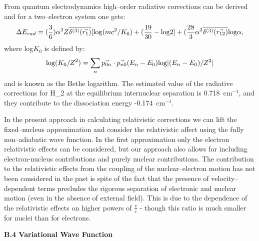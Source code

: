 From quantum electrodynamics high--order radiative corrections can 
be derived and for a two--electron system one gets:\cite{k15}
\begin{equation}
\Delta E_{rad} = (\frac{3}{6})
\alpha^3 Z \overline{\delta^{(3)} (\vec{r_1})}
[{\rm log}(mc^2/K_0) + (\frac{19}{30} - {\rm log}2]
+ (\frac{28}{3} \alpha^3 \overline{\delta^{(3)}(\vec{r_{12}})}
{\rm log} \alpha,
\end{equation}
where log$K_0$ is defined by:
\begin{equation}
[\sum_{n} \vec{p_{0n}} \cdot \vec{p_{n0}}(E_n - E_0)]
{\rm log} (K_0 / Z^2) =
\sum_n \vec{p_{0n}} \cdot \vec{p_{n0}} 
(E_n - E_0) {\rm log} |(E_n - E_0)/Z^2|
\end{equation}
and is known as the Bethe logarithm. 
The estimated value of the radiative corrections for H_{2} at  the 
equilibrium internuclear separation is 0.718~cm$^{-1}$,
and they contribute to the dissociation energy -0.174~cm$^{-1}$.
\cite{kk}

In the present approach in calculating relativistic 
corrections we can lift the fixed--nucleus approximation
and consider the relativistic affect using
the fully non--adiabatic wave function. 
In the first approximation only the electron 
relativistic effects can be considered, but our
approach also allows for including electron-nucleus
contributions and purely nuclear contributions.
The contribution to the relativistic effects from
the coupling of the nuclear--electron motion has not been
considered in the past is spite of the fact that the
presence of velocity--dependent terms
precludes the rigorous separation of electronic
and nuclear motion (even in the absence of external field).
This is due to the dependence of the relativistic
effects on higher powers of $\frac{v}{c}$ - though
this ratio is much smaller for nuclei than for
electrons. 



\vspace{2mm}
\noindent
{\bf B.4 Variational Wave Function}


